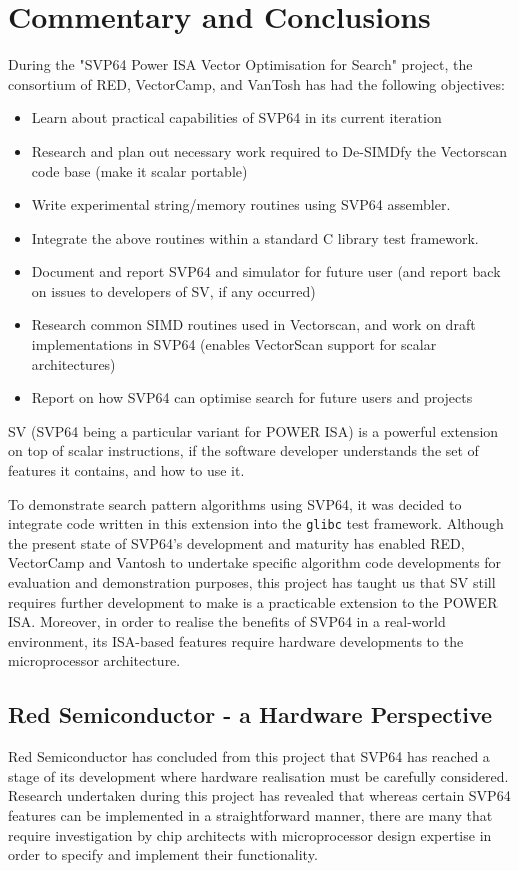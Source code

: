 \chapter{Commentary and Conclusions}

During the "SVP64 Power ISA Vector Optimisation for Search" project, the
consortium of RED, VectorCamp, and VanTosh has had the following objectives:

\begin{itemize}
  \item Learn about practical capabilities of SVP64 in its current iteration
  \item Research and plan out necessary work required to De-SIMDfy the
        Vectorscan code base (make it scalar portable)
  \item Write experimental string/memory routines using SVP64 assembler.
  \item Integrate the above routines within a standard C library test framework.
  \item Document and report SVP64 and simulator for future user (and report
        back on issues to developers of SV, if any occurred)
  \item Research common SIMD routines used in Vectorscan, and work on draft
        implementations in SVP64 (enables VectorScan support for scalar
        architectures)
  \item Report on how SVP64 can optimise search for future users and projects
\end{itemize}

\acrfull{SV} (\acrshort{SVP64} being a particular variant for \acrshort{POWER}
ISA) is a powerful extension on top of scalar instructions, if the software
developer understands the set of features it contains, and how to use it.

To demonstrate search pattern algorithms using \acrshort{SVP64}, it was decided
to integrate code written in this extension into the \texttt{glibc}
test framework.
Although the present state of SVP64's development and maturity has enabled RED,
VectorCamp and Vantosh to undertake specific algorithm code developments for
evaluation and demonstration purposes, this project has taught us that
\acrshort{SV} still requires further development to make is a practicable
extension to the POWER ISA. Moreover, in order to realise the benefits of SVP64
in a real-world environment, its ISA-based features require hardware
developments to the microprocessor architecture.

\section{Red Semiconductor - a Hardware Perspective}
Red Semiconductor has concluded from this project that SVP64 has reached a
stage of its development where hardware realisation must be carefully
considered. Research undertaken during this project has revealed that whereas
certain SVP64 features can be implemented in a straightforward manner, there
are many that require investigation by chip architects with microprocessor
design expertise in order to specify and implement their functionality.

